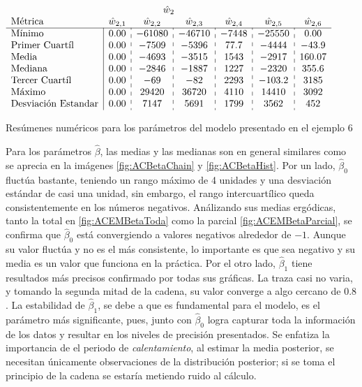 \documentclass[../Main/Main.tex]{subfiles}
\begin{document}
\begin{table}[p]
\begin{subtable}{\textwidth}
		$\begin{array}{l|c:c:c:c:c:c}
		\multicolumn{7}{c}{\hat{w}_2} \\
		\text{Métrica} & \hat{w}_{2,1} & \hat{w}_{2,2} & \hat{w}_{2,3} & \hat{w}_{2,4} & \hat{w}_{2,5} & \hat{w}_{2,6} \\
        \hline                    
		\text{Mínimo} 			& 0.00 & -61080 &  -46710	&  -7448 &	-25550  &  0.00 \\
		\text{Primer Cuartíl} 	& 0.00 &  -7509 &  -5396	&  77.7	 &	-4444   &  -43.9 \\
		\text{Media} 			& 0.00 &  -4693 &  -3515	&  1543  &	-2917   &  160.07 \\
		\text{Mediana} 			& 0.00 &  -2846 &  -1887	&  1227  &	-2320   &  355.6 \\
		\text{Tercer Cuartíl} 	& 0.00 &    -69 &    -82	&  2293  &	-103.2  &  3185 \\
		\text{Máximo} 			& 0.00 &  29420 &  36720	&  4110  &	14410   &  3092 \\
		\text{Desviación Estandar} & 0.00 &   7147 &   5691	&  1799  &	3562    &  452 
		\end{array}$
	\end{subtable}
	\caption{Resúmenes numéricos para los parámetros del modelo presentado en el ejemplo 6}
	\label{tab:ParametrosConv}
\end{table}

Para los parámetros $\hat{\beta}$, las medias y las medianas son en general similares como se aprecia en la imágenes \ref{fig:ACBetaChain} y \ref{fig:ACBetaHist}. Por un lado, $\hat{\beta}_0$ fluctúa bastante, teniendo un rango máximo de 4 unidades y una desviación estándar de casi una unidad, sin embargo, el rango intercuartílico queda consistentemente en los números negativos. Análizando sus medias ergódicas, tanto la total en  \ref{fig:ACEMBetaToda} como la parcial \ref{fig:ACEMBetaParcial}, se confirma que $\hat{\beta}_0$ está convergiendo a valores negativos alrededor de $-1$. Aunque su valor fluctúa y no es el más consistente, lo importante es que sea negativo y su media es un valor que funciona en la práctica. Por el otro lado, $\hat{\beta}_1$ tiene resultados más precisos confirmado por todas sus gráficas. La traza casi no varia, y tomando la segunda mitad de la cadena, su valor converge a algo cercano de $0.8$. La estabilidad de $\hat{\beta}_1$, se debe a que es fundamental para el modelo, es el parámetro más significante, pues, junto con $\hat{\beta}_0$ logra capturar toda la información de los datos y resultar en los niveles de precisión presentados. Se enfatiza la importancia de el periodo de \textit{calentamiento}, al estimar la media posterior, se necesitan únicamente observaciones de la distribución posterior; si se toma el principio de la cadena se estaría metiendo ruido al cálculo.
\end{document}
